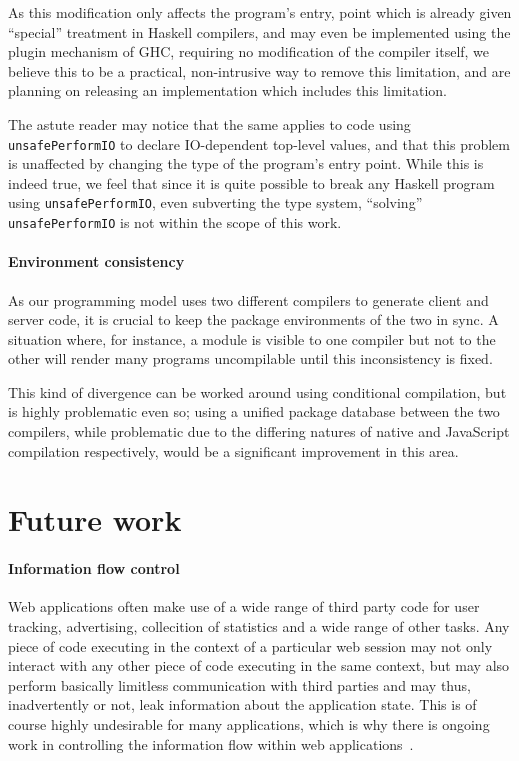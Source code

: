 \documentclass[preprint]{sigplanconf}
\begin{document}
As this modification only affects the program's entry, point which is already
given ``special'' treatment in Haskell compilers, and may even be implemented
using the plugin mechanism of GHC, requiring no modification of the compiler
itself, we believe this to be a practical, non-intrusive way to remove this
limitation, and are planning on releasing an implementation which includes
this limitation.

The astute reader may notice that the same applies to code using
\lstinline!unsafePerformIO! to declare IO-dependent top-level values, and that
this problem is unaffected by changing the type of the program's entry point.
While this is indeed true, we feel that since it is quite possible to break
any Haskell program using \lstinline!unsafePerformIO!, even subverting the type
system, ``solving'' \lstinline!unsafePerformIO! is not within the scope of this
work.

\paragraph{Environment consistency} As our programming model uses two different
compilers to generate client and server code, it is crucial to keep the package
environments of the two in sync. A situation where, for instance, a module is
visible to one compiler but not to the other will render many programs
uncompilable until this inconsistency is fixed.

This kind of divergence can be worked around using conditional compilation, but
is highly problematic even so; using a unified package database between the two
compilers, while problematic due to the differing natures of native and
JavaScript compilation respectively, would be a significant improvement in this
area.

\section{Future work}

\paragraph{Information flow control} Web applications often make use of a wide
range of third party code for user tracking, advertising, collecition of
statistics and a wide range of other tasks. Any piece of code executing in the
context of a particular web session may not only interact with any other piece
of code executing in the same context, but may also perform basically limitless
communication with third parties and may thus, inadvertently or not, leak
information about the application state. This is of course highly undesirable
for many applications, which is why there is ongoing work in controlling the
information flow within web applications\ \cite{jsflow}.
\end{document}
